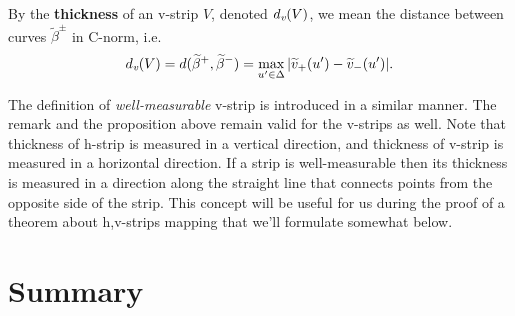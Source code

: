 \begin{definition}
	By the {\bf thickness} of an v-strip $V$, denoted $d_\emph{v}(V)$, we mean the distance between curves $\widetilde{\beta}^{\pm}$ in C-norm, i.e.
	\begin{equation}
		d_\emph{v}(V) = d(\widetilde{\beta}^+, \widetilde{\beta}^-) = \max \limits_{u' \in \Delta} |\widetilde{v}_+(u') - \widetilde{v}_-(u')|.
	\label{eq:v-thickness}
	\end{equation}
\end{definition}

The definition of {\it well-measurable} v-strip is introduced in a similar manner.
The remark and the proposition above remain valid for the v-strips as well.
Note that thickness of h-strip is measured in a vertical direction, and thickness of v-strip is measured in a horizontal direction.
If a strip is well-measurable then its thickness is measured in a direction along the straight line that connects points from the opposite side of the strip.
This concept will be useful for us during the proof of a theorem about h,v-strips mapping that we'll formulate somewhat below.

\section{Summary}